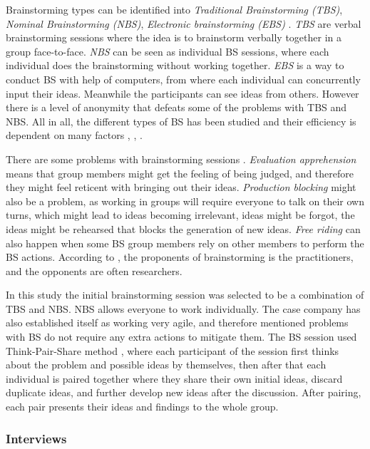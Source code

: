 \documentclass[english, 12pt, a4paper, sci, utf8, a-1b, online]{aaltothesis}
\begin{document}
Brainstorming types can be identified into \textit{Traditional Brainstorming (TBS)}, \textit{Nominal Brainstorming (NBS)}, \textit{Electronic brainstorming (EBS)} \citep{brainstorming-techniques}. \textit{TBS} are verbal brainstorming sessions where the idea is to brainstorm verbally together in a group face-to-face. \textit{NBS} can be seen as individual BS sessions, where each individual does the brainstorming without working together. \textit{EBS} is a way to conduct BS with help of computers, from where each individual can concurrently input their ideas. Meanwhile the participants can see ideas from others. However there is a level of anonymity that defeats some of the problems with TBS and NBS.  All in all, the different types of BS has been studied and their efficiency is dependent on many factors \citep{productivity-loss-in-brainstorming-groups}, \citep{electronic-brainstorming}, \citep{chainstorm}.

There are some problems with brainstorming sessions \citep{electronic-brainstorming} \citep{chainstorm}. \textit{Evaluation apprehension} means that group members might get the feeling of being judged, and therefore they might feel reticent with bringing out their ideas. \textit{Production blocking} might also be a problem, as working in groups will require everyone to talk on their own turns, which might lead to ideas becoming irrelevant, ideas might be forgot, the ideas might be rehearsed that blocks the generation of new ideas. \textit{Free riding} can also happen when some BS group members rely on other members to perform the BS actions. According to \cite{six-issues-of-brainstorming}, the proponents of brainstorming is the practitioners, and the opponents are often researchers.

In this study the initial brainstorming session was selected to be a combination of TBS and NBS. NBS allows everyone to work individually. The case company has also established itself as working very agile, and therefore mentioned problems with BS do not require any extra actions to mitigate them. The BS session used Think-Pair-Share method \citep{think-pair-share}, where each participant of the session first thinks about the problem and possible ideas by themselves, then after that each individual is paired together where they share their own initial ideas, discard duplicate ideas, and further develop new ideas after the discussion. After pairing, each pair presents their ideas and findings to the whole group.

\subsubsection{Interviews}
\end{document}
